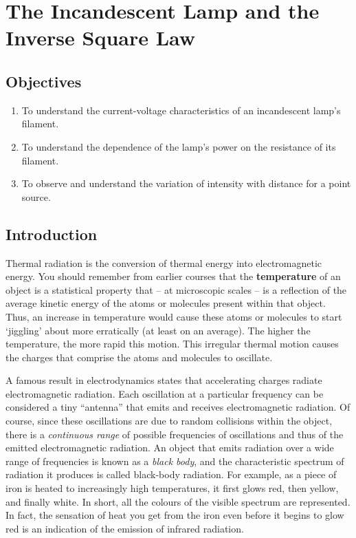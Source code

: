 
\chapter{The Incandescent Lamp and the Inverse Square Law}

\section*{Objectives}

\begin{enumerate}
\item To understand the current-voltage characteristics of an incandescent lamp's filament.
\item To understand the dependence of the lamp's power on the resistance of its filament.
\item To observe and understand the variation of intensity with distance for a point source.
\end{enumerate}




\section*{Introduction}

Thermal radiation is the conversion of thermal energy into electromagnetic energy. You should remember from earlier courses that the \textbf{temperature} of an object is a statistical property that -- at microscopic scales -- is a reflection of the average kinetic energy of the atoms or molecules present within that object. Thus, an increase in temperature would cause these atoms or molecules to start `jiggling' about more erratically (at least on an average). The higher the temperature, the more rapid this motion. This irregular thermal motion causes the charges that comprise the atoms and molecules to oscillate. 

A famous result in electrodynamics states that accelerating charges radiate electromagnetic radiation. Each oscillation at a particular frequency can be considered a tiny ``antenna'' that emits and receives electromagnetic radiation. Of course, since these oscillations are due to random collisions within the object, there is a \textit{continuous range} of possible frequencies of oscillations and thus of the emitted electromagnetic radiation. An object that emits radiation over a wide range of frequencies is known as a \textit{black body}, and the characteristic spectrum of radiation it produces is called black-body radiation. For example, as a piece of iron is heated to increasingly high temperatures, it first glows red, then yellow, and finally white. In short, all the colours of the visible spectrum are represented. In fact, the sensation of heat you get from the iron even before it begins to glow red is an indication of the emission of infrared radiation.

